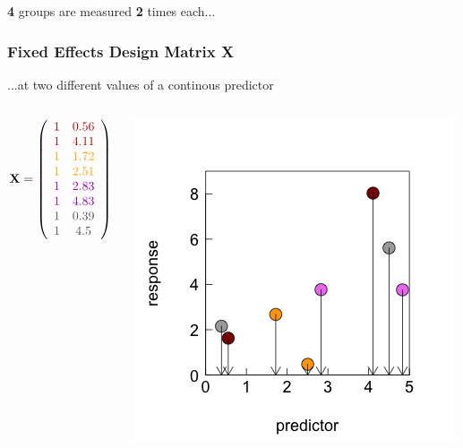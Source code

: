 \documentclass{beamer}
\begin{document}
\begin{frame}[fragile]
\begin{columns}
\begin{column}{0.5\textwidth}
        \end{column}
    \end{columns}
    \vspace{0.3cm}
    
    \large\textbf{4} groups are measured \textbf{2} times each...
\end{frame}

\begin{frame}
\frametitle{Fixed Effects Design Matrix X}
\large ...at two different values of a continous predictor
\begin{columns}
        \begin{column}{0.5\textwidth}
            \[
\mathbf{X} = \left( 
\begin{array}{cc} 
\color{darkred}{1} & \color{darkred}{0.56} \\ 
\color{darkred}{1} & \color{darkred}{4.11} \\ 
\color{orange}{1} & \color{orange}{1.72} \\ 
\color{orange}{1} & \color{orange}{2.51} \\ 
\color{violet}{1} & \color{violet}{2.83} \\ 
\color{violet}{1} & \color{violet}{4.83} \\ 
\color{darkgray}{1} & \color{darkgray}{0.39} \\ 
\color{darkgray}{1} & \color{darkgray}{4.5} 
\end{array}\right)
\]
        \end{column}
        \begin{column}{0.5\textwidth}
            \includegraphics[width=\textwidth]{lectures/day_5_theory_of_mems/figures/unnamed-chunk-4-1.png}
        \end{column}
    \end{columns}

\end{frame}
\end{document}

